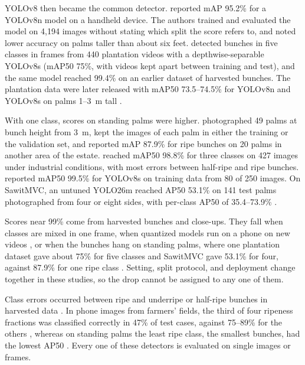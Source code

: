 YOLOv8 then became the common detector. \citet{noordin2025real} reported mAP 95.2\% for a YOLOv8n model on a handheld device. The authors trained and evaluated the model on 4{,}194 images without stating which split the score refers to, and noted lower accuracy on palms taller than about six feet. \citet{naftali2024palm} detected bunches in five classes in frames from 440 plantation videos with a depthwise-separable YOLOv8s (mAP50 75\%, with videos kept apart between training and test), and the same model reached 99.4\% on an earlier dataset of harvested bunches. The plantation data were later released with mAP50 73.5--74.5\% for YOLOv8n and YOLOv8s on palms 1--3~m tall \citep{suharjito2025oil}.

With one class, scores on standing palms were higher. \citet{lai2022real} photographed 49 palms at bunch height from 3~m, kept the images of each palm in either the training or the validation set, and reported mAP 87.9\% for ripe bunches on 20 palms in another area of the estate. \citet{jumrat2026detection} reached mAP50 98.8\% for three classes on 427 images under industrial conditions, with most errors between half-ripe and ripe bunches. \citet{hutapea2025comparison} reported mAP50 99.5\% for YOLOv8s on training data from 80 of 250 images. On SawitMVC, an untuned YOLO26m reached AP50 53.1\% on 141 test palms photographed from four or eight sides, with per-class AP50 of 35.4--73.9\% \citep{indriani2026sawitmvc}.

Scores near 99\% come from harvested bunches and close-ups. They fall when classes are mixed in one frame, when quantized models run on a phone on new videos \citep{suharjito2023real}, or when the bunches hang on standing palms, where one plantation dataset gave about 75\% for five classes and SawitMVC gave 53.1\% for four, against 87.9\% for one ripe class \citep{lai2022real}. Setting, split protocol, and deployment change together in these studies, so the drop cannot be assigned to any one of them.

Class errors occurred between ripe and underripe or half-ripe bunches in harvested data \citep{suharjito2023real,jumrat2026detection}. In phone images from farmers' fields, the third of four ripeness fractions was classified correctly in 47\% of test cases, against 75--89\% for the others \citep{harmiansyah2024detection}, whereas on standing palms the least ripe class, the smallest bunches, had the lowest AP50 \citep{indriani2026sawitmvc}. Every one of these detectors is evaluated on single images or frames.

